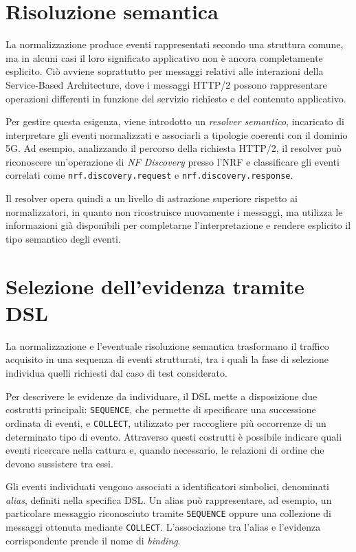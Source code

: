 \section{Risoluzione semantica}\label{risoluzione-semantica}

La normalizzazione produce eventi rappresentati secondo una struttura comune, ma in alcuni casi il loro significato applicativo non è ancora completamente esplicito. Ciò avviene soprattutto per messaggi relativi alle interazioni della Service-Based Architecture, dove i messaggi HTTP/2 possono rappresentare operazioni differenti in funzione del servizio richiesto e del contenuto applicativo.

Per gestire questa esigenza, viene introdotto un \emph{resolver semantico}, incaricato di interpretare gli eventi normalizzati e associarli a tipologie coerenti con il dominio 5G. Ad esempio, analizzando il percorso della richiesta HTTP/2, il resolver può riconoscere un'operazione di \emph{NF Discovery} presso l'NRF e classificare gli eventi correlati come \texttt{nrf.discovery.request} e \texttt{nrf.discovery.response}.

Il resolver opera quindi a un livello di astrazione superiore rispetto ai normalizzatori, in quanto non ricostruisce nuovamente i messaggi, ma utilizza le informazioni già disponibili per completarne l'interpretazione e rendere esplicito il tipo semantico degli eventi.

\section{Selezione dell'evidenza tramite DSL}\label{selezione-dellevidenza-tramite-dsl}

La normalizzazione e l'eventuale risoluzione semantica trasformano il traffico acquisito in una sequenza di eventi strutturati, tra i quali la fase di selezione individua quelli richiesti dal caso di test considerato.

Per descrivere le evidenze da individuare, il DSL mette a disposizione due costrutti principali: \texttt{SEQUENCE}, che permette di specificare una successione ordinata di eventi, e \texttt{COLLECT}, utilizzato per raccogliere più occorrenze di un determinato tipo di evento. Attraverso questi costrutti è possibile indicare quali eventi ricercare nella cattura e, quando necessario, le relazioni di ordine che devono sussistere tra essi.

Gli eventi individuati vengono associati a identificatori simbolici, denominati \emph{alias}, definiti nella specifica DSL. Un alias può rappresentare, ad esempio, un particolare messaggio riconosciuto tramite \texttt{SEQUENCE} oppure una collezione di messaggi ottenuta mediante \texttt{COLLECT}. L'associazione tra l'alias e l'evidenza corrispondente prende il nome di \emph{binding}.

